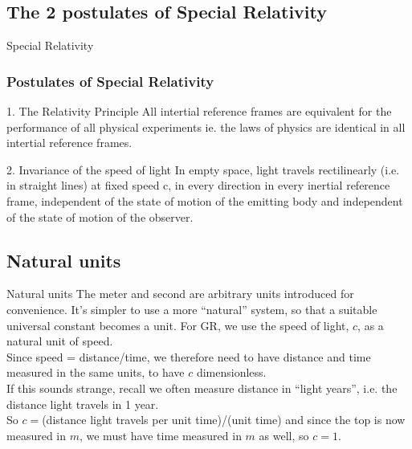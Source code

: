 \documentclass[xcolor=x11names,compress]{beamer}
\renewcommand{\(}{\begin{columns}}
\renewcommand{\)}{\end{columns}}
\newcommand{\<}[1]{\begin{column}{#1}}
\renewcommand{\>}{\end{column}}
\begin{document}
\subsection{The 2 postulates of Special Relativity}
\begin{frame}{Special Relativity}
\frametitle{Postulates of Special Relativity}

\begin{beamerboxesrounded}[upper=uppercol,lower=lowercol,shadow=true]
{1. The Relativity Principle}
All intertial reference frames are equivalent for the performance 
of all physical experiments ie. the laws of physics are identical 
in all intertial reference frames.
\end{beamerboxesrounded}

\bigskip

\begin{beamerboxesrounded}[upper=uppercol,lower=lowercol,shadow=true]
{2. Invariance of the speed of light}
In empty space, light travels rectilinearly (i.e. in straight lines) 
at fixed speed c, in every direction in every inertial reference frame,
independent of the state of motion of the emitting body and independent 
of the state of motion of the observer.
\end{beamerboxesrounded}

\end{frame}

\subsection{Natural units}
\begin{frame}{Natural units}
The meter and second are arbitrary units introduced for convenience.  
It's simpler to use a more ``natural'' system, so that a suitable 
universal constant becomes a unit.  For GR, we use the speed 
of light, $c$, as a natural unit of speed.\\
\bigskip
Since speed = distance/time, we therefore need to have distance and
time measured in the same units, to have $c$ dimensionless.\\
\bigskip
If this sounds strange, recall we often measure distance 
in ``light years'', i.e. the distance light travels in 1 year.\\
\bigskip
So $c = $(distance light travels per unit time)/(unit time)
and since the top is now measured in $m$, we must have time measured in
$m$ as well, so $c = 1$.
\end{frame}
\end{document}
